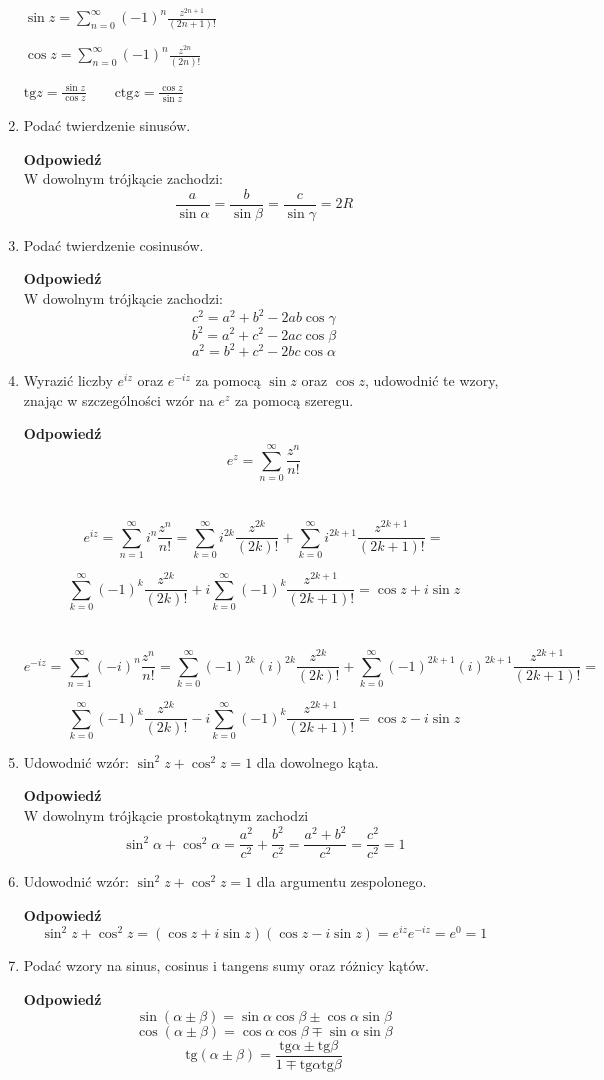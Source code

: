 \documentclass[12pt,a4paper]{article}
\newcounter{twierdzenie}
\theoremstyle{break}
\newcommand{\Odp}[1]{
		\begin{mdframed}[style=zadanie]
			\textbf{Odpowiedź}\\
			#1
		\end{mdframed}
	}
\newcommand{\tg}{\text{tg}}
\newcommand{\ctg}{\text{ctg}}
\begin{document}
\begin{enumerate}[1.]
{		$\sin z=\sum_{n=0}^{\infty}(-1)^n\frac{z^{2n+1}}{(2n+1)!}$
		
		$\cos z=\sum_{n=0}^{\infty}(-1)^n\frac{z^{2n}}{(2n)!}$
		
		$\tg z=\frac{\sin z}{\cos z} \qquad \ctg z=\frac{\cos z}{\sin z}$
	}
	
	\item Podać twierdzenie sinusów.
	\Odp{
		W dowolnym trójkącie zachodzi:
		$$\frac{a}{\sin\alpha}=\frac{b}{\sin\beta}=\frac{c}{\sin\gamma}=2R$$
	}
	\newpage
	\item Podać twierdzenie cosinusów.
	\Odp{
		W dowolnym trójkącie zachodzi:
		$$c^2=a^2+b^2-2ab\cos\gamma$$
		$$b^2=a^2+c^2-2ac\cos\beta$$
		$$a^2=b^2+c^2-2bc\cos\alpha$$
	}
	
	\item Wyrazić liczby $e^{iz}$ oraz $e^{-iz}$ za pomocą $\sin z$ oraz $\cos z$, udowodnić te wzory, znając w	szczególności wzór na $e^z$ za pomocą szeregu.
	\Odp{
		$$e^z=\sum_{n=0}^{\infty} \frac{z^n}{n!}$$\\\\
		
		$$e^{iz}=\sum_{n=1}^{\infty} i^n\frac{z^n}{n!}=
		\sum_{k=0}^{\infty}i^{2k}\frac{z^{2k}}{(2k)!}+\sum_{k=0}^{\infty}i^{2k+1}\frac{z^{2k+1}}{(2k+1)!}=$$
		
		 $$
		\sum_{k=0}^{\infty}(-1)^{k}\frac{z^{2k}}{(2k)!}+i\sum_{k=0}^{\infty}(-1)^{k}\frac{z^{2k+1}}{(2k+1)!}=\cos z + i\sin z$$\\\\
		
		$$e^{-iz}=\sum_{n=1}^{\infty} (-i)^n\frac{z^n}{n!}=
		\sum_{k=0}^{\infty}(-1)^{2k}(i)^{2k}\frac{z^{2k}}{(2k)!}+\sum_{k=0}^{\infty}(-1)^{2k+1}(i)^{2k+1}\frac{z^{2k+1}}{(2k+1)!}=$$
		
		$$\sum_{k=0}^{\infty}(-1)^{k}\frac{z^{2k}}{(2k)!}-i\sum_{k=0}^{\infty}(-1)^{k}\frac{z^{2k+1}}{(2k+1)!}=\cos z - i\sin z$$
		
	}
	
	\item Udowodnić wzór: $\sin^2 z + \cos^2 z = 1$ dla dowolnego kąta.
	\Odp{
		W dowolnym trójkącie prostokątnym zachodzi
		$$\sin^2\alpha+\cos^2\alpha=\frac{a^2}{c^2}+\frac{b^2}{c^2}=\frac{a^2+b^2}{c^2}=\frac{c^2}{c^2}=1$$	
	}
	\newpage
	\item Udowodnić wzór: $\sin^2 z + \cos^2 z = 1$ dla argumentu zespolonego.
	\Odp{
		$$\sin^2z+\cos^2z = (\cos z+i\sin z)(\cos z-i\sin z)=e^{iz}e^{-iz}=e^0=1$$
	}
	
	\item Podać wzory na sinus, cosinus i tangens sumy oraz różnicy kątów.
	\Odp{
		$$\sin(\alpha\pm\beta)=\sin\alpha\cos\beta\pm\cos\alpha\sin\beta$$
		$$\cos(\alpha\pm\beta)=\cos\alpha\cos\beta\mp\sin\alpha\sin\beta$$
		$$\tg(\alpha\pm\beta)=\frac{\tg\alpha\pm\tg\beta}{1\mp\tg\alpha\tg\beta}$$
	}
	

\end{enumerate}
\end{document}
